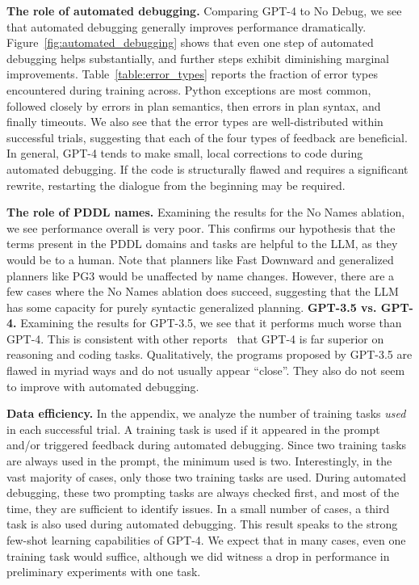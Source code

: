 \documentclass[letterpaper]{article} %
\begin{document}
\textbf{The role of automated debugging.}
Comparing GPT-4 to No Debug, we see that automated debugging generally improves performance dramatically.
Figure~\ref{fig:automated_debugging} shows that even one step of automated debugging helps substantially, and further steps exhibit diminishing marginal improvements.
Table~\ref{table:error_types} reports the fraction of error types encountered during training across.
Python exceptions are most common, followed closely by errors in plan semantics, then errors in plan syntax, and finally timeouts.
We also see that the error types are well-distributed within successful trials, suggesting that each of the four types of feedback are beneficial.
In general, GPT-4 tends to make small, local corrections to code during automated debugging.
If the code is structurally flawed and requires a significant rewrite, restarting the dialogue from the beginning may be required.

\textbf{The role of PDDL names.}
Examining the results for the No Names ablation, we see performance overall is very poor.
This confirms our hypothesis that the terms present in the PDDL domains and tasks are helpful to the LLM, as they would be to a human.
Note that planners like Fast Downward and generalized planners like PG3 would be unaffected by name changes.
However, there are a few cases where the No Names ablation does succeed, suggesting that the LLM has some capacity for purely syntactic generalized planning.  \textbf{GPT-3.5 vs. GPT-4.}
Examining the results for GPT-3.5, we see that it performs much worse than GPT-4.
This is consistent with other reports~\cite{openai2023gpt4,bubeck2023sparks} that GPT-4 is far superior on reasoning and coding tasks.
Qualitatively, the programs proposed by GPT-3.5 are flawed in myriad ways and do not usually appear ``close''.
They also do not seem to improve with automated debugging.

\textbf{Data efficiency.}
In the appendix, we analyze the number of training tasks \emph{used} in each successful trial.
A training task is used if it appeared in the prompt and/or triggered feedback during automated debugging.
Since two training tasks are always used in the prompt, the minimum used is two.
Interestingly, in the vast majority of cases, only those two training tasks are used.
During automated debugging, these two prompting tasks are always checked first, and most of the time, they are sufficient to identify issues.
In a small number of cases, a third task is also used during automated debugging.
This result speaks to the strong few-shot learning capabilities of GPT-4.
We expect that in many cases, even one training task would suffice, although we did witness a drop in performance in preliminary experiments with one task.
\end{document}
